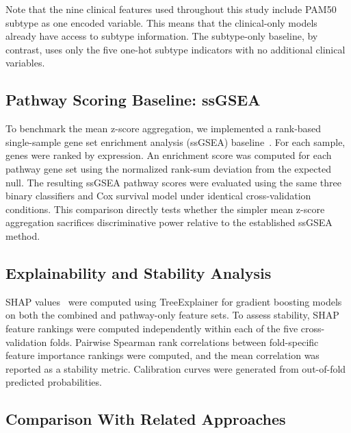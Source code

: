 \documentclass[journal]{IEEEtran}
\begin{document}
Note that the nine clinical features used throughout this study include PAM50 subtype as one encoded variable. This means that the clinical-only models already have access to subtype information. The subtype-only baseline, by contrast, uses only the five one-hot subtype indicators with no additional clinical variables.

\subsection{Pathway Scoring Baseline: ssGSEA}

To benchmark the mean z-score aggregation, we implemented a rank-based single-sample gene set enrichment analysis (ssGSEA) baseline~\cite{barbie2009}. For each sample, genes were ranked by expression. An enrichment score was computed for each pathway gene set using the normalized rank-sum deviation from the expected null. The resulting ssGSEA pathway scores were evaluated using the same three binary classifiers and Cox survival model under identical cross-validation conditions. This comparison directly tests whether the simpler mean z-score aggregation sacrifices discriminative power relative to the established ssGSEA method.

\subsection{Explainability and Stability Analysis}

SHAP values~\cite{lundberg2017} were computed using TreeExplainer for gradient boosting models on both the combined and pathway-only feature sets. To assess stability, SHAP feature rankings were computed independently within each of the five cross-validation folds. Pairwise Spearman rank correlations between fold-specific feature importance rankings were computed, and the mean correlation was reported as a stability metric. Calibration curves were generated from out-of-fold predicted probabilities.

\subsection{Comparison With Related Approaches}
\end{document}
